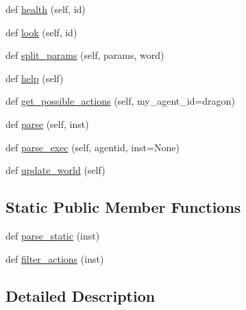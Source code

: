 \begin{DoxyCompactItemize}
\item 
def \hyperlink{classmastering__the__dungeon_1_1tasks_1_1graph__world2_1_1graph_1_1Graph_a5c3264184a314f9c922dfa85adbc1317}{health} (self, id)
\item 
def \hyperlink{classmastering__the__dungeon_1_1tasks_1_1graph__world2_1_1graph_1_1Graph_ad1d29bcd12397fa3b8813799f9b4f058}{look} (self, id)
\item 
def \hyperlink{classmastering__the__dungeon_1_1tasks_1_1graph__world2_1_1graph_1_1Graph_ad6154c88ce3c912fbe9dce0cd8e96d13}{split\+\_\+params} (self, params, word)
\item 
def \hyperlink{classmastering__the__dungeon_1_1tasks_1_1graph__world2_1_1graph_1_1Graph_a1a09e41d73b4ddb7052ac6c4f29ba6ed}{help} (self)
\item 
def \hyperlink{classmastering__the__dungeon_1_1tasks_1_1graph__world2_1_1graph_1_1Graph_adae1cb52439416a6a372d2b5fe4e7fb0}{get\+\_\+possible\+\_\+actions} (self, my\+\_\+agent\+\_\+id=\textquotesingle{}dragon\textquotesingle{})
\item 
def \hyperlink{classmastering__the__dungeon_1_1tasks_1_1graph__world2_1_1graph_1_1Graph_ac0f86925261cb5f95202f17b41c2832f}{parse} (self, inst)
\item 
def \hyperlink{classmastering__the__dungeon_1_1tasks_1_1graph__world2_1_1graph_1_1Graph_a3e15de765a5c825f15f66737b2e9118e}{parse\+\_\+exec} (self, agentid, inst=None)
\item 
def \hyperlink{classmastering__the__dungeon_1_1tasks_1_1graph__world2_1_1graph_1_1Graph_a062ee34ffc89612a75b281a024f74c55}{update\+\_\+world} (self)
\end{DoxyCompactItemize}
\subsection*{Static Public Member Functions}
\begin{DoxyCompactItemize}
\item 
def \hyperlink{classmastering__the__dungeon_1_1tasks_1_1graph__world2_1_1graph_1_1Graph_a1f72057a02cccb1420bc4116d8b42786}{parse\+\_\+static} (inst)
\item 
def \hyperlink{classmastering__the__dungeon_1_1tasks_1_1graph__world2_1_1graph_1_1Graph_a965e5cb857d2d1660404b61f5525d8ba}{filter\+\_\+actions} (inst)
\end{DoxyCompactItemize}


\subsection{Detailed Description}


